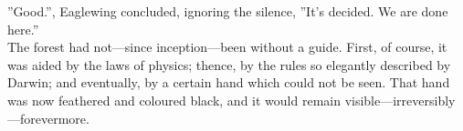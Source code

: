 ”Good.”, Eaglewing concluded, ignoring the silence, ”It's decided. We are done here.”\\

The forest had not---since inception---been without a guide. First, of course, it was aided by the laws of physics; thence, by the rules so elegantly described by Darwin; and eventually, by a certain hand which could not be seen. That hand was now feathered and coloured black, and it would remain visible---irreversibly---forevermore.